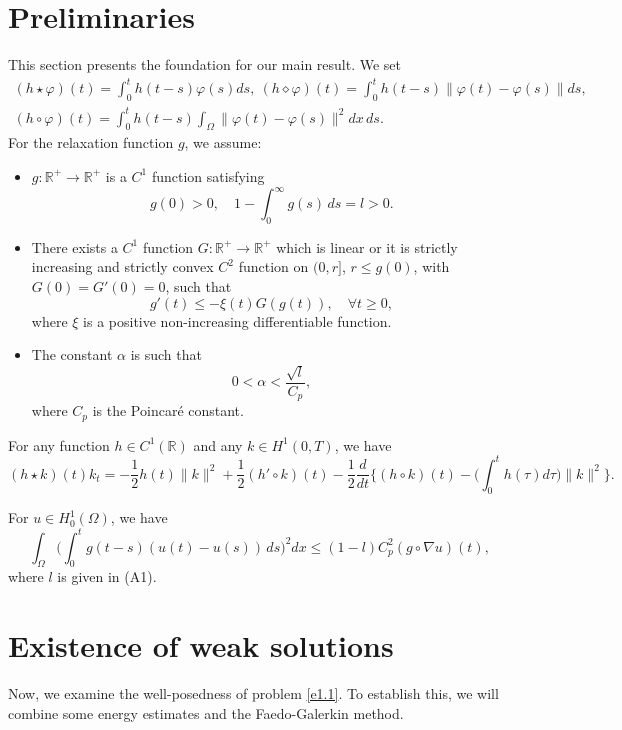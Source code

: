  \section{Preliminaries}

 This section presents the foundation for our main result. We set
 \begin{gather*}
 (h \star \varphi)(t) = \int_0^t h(t-s) \varphi(s)ds,\
 (h \diamond \varphi)(t) = \int_0^t h(t-s)\| \varphi(t)- \varphi(s)\| ds, \\
 (h \circ \varphi)(t) = \int_0^t h(t-s)\int_\Omega\| \varphi(t)- \varphi(s)\|^2 dx \, ds.
 \end{gather*}
 For the relaxation function $g$, we assume:
 \begin{itemize}
\item[(A1)] $g: \mathbb{R}^+ \to \mathbb{R}^+ $ is a $ C^1$ function satisfying\\
\begin{equation*}
 g(0) > 0, \quad 1-\int_0^{\infty} g(s) \, ds = l > 0. \label{e2.1}
\end{equation*}

\item[(A2)] There exists a $C^1$ function $G :\mathbb{R}^+ \to \mathbb{R}^+ $
which is linear or it is strictly increasing and strictly convex $C^2$ function on
$(0, r]$, $r \leq g(0)$, with $G(0) = G'(0) = 0$, such that
\begin{equation} \label{e2.2}
g'(t) \leq -\xi(t) G(g(t)),\quad \forall t \geq 0,
\end{equation}
where $\xi$ is a positive non-increasing differentiable function.

\item[(A3)] The constant $\alpha $ is such that
\begin{equation} \label{e2.3}
0 < \alpha < \frac{\sqrt{l} }{C_p},
\end{equation}
where $C_p$ is the Poincar\'e constant.
\end{itemize}

\begin{lemma} \label{lem1}
For any function $h \in C^1 (\mathbb{R})$ and any $k \in H^1 (0,T)$, we have
$$
(h \star k)(t) k_t
 = -\frac{1}{2} h(t)  \| k\|^2 + \frac{1}{2} (h' \circ k)(t)
 -\frac{1}{2} \frac{d}{dt} \Big\{( h \circ k)(t)
 - \Big( \int_0^t h(\tau) d\tau \Big) \|k\|^2 \Big\}.
$$
\end{lemma}

\begin{lemma} \label{lem2}
 For $u \in H^1_0(\Omega)$, we have
\begin{equation}
\int_\Omega \Big( \int_0^t g(t - s)(u(t) - u(s)) \, ds \Big)^2 dx
\leq (1 - l) C_p^2 (g \circ \nabla u)(t),\label{e2.4}
\end{equation}
where $l$ is given in {\rm (A1)}.
\end{lemma}

\section{Existence of weak solutions}
Now, we examine the well-posedness of problem \eqref{e1.1}. To establish this, we will combine some energy estimates and the Faedo-Galerkin method.

